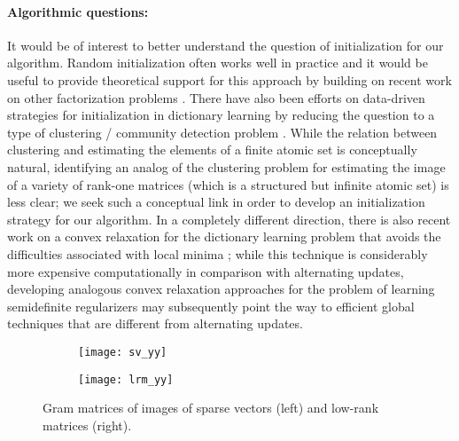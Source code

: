 \documentclass[11pt,letterpaper]{article}
\newcommand{\R}{\mathbb{R}}
\begin{document}
\paragraph{Algorithmic questions:} It would be of interest to better understand the question of initialization for our algorithm.  Random initialization often works well in practice and it would be useful to provide theoretical support for this approach by building on recent work on other factorization problems \cite{GLM:16,SWQ:16c}.  There have also been efforts on data-driven strategies for initialization in dictionary learning by reducing the question to a type of clustering / community detection problem \cite{AAN:17,AGM:14}.  While the relation between clustering and estimating the elements of a finite atomic set is conceptually natural, identifying an analog of the clustering problem for estimating the image of a variety of rank-one matrices (which is a structured but infinite atomic set) is less clear; we seek such a conceptual link in order to develop an initialization strategy for our algorithm.  In a completely different direction, there is also recent work on a convex relaxation for the dictionary learning problem that avoids the difficulties associated with local minima \cite{BKS:15}; while this technique is considerably more expensive computationally in comparison with alternating updates, developing analogous convex relaxation approaches for the problem of learning semidefinite regularizers may subsequently point the way to efficient global techniques that are different from alternating updates.

\begin{figure}
	\centering
	\begin{subfigure}{.5\textwidth}
		\centering
		\texttt{[image: sv\_yy]}
		\label{fig:sparsegram}
	\end{subfigure}%
	\begin{subfigure}{.5\textwidth}
		\centering
		\texttt{[image: lrm\_yy]}
		\label{fig:lowrankgram}
	\end{subfigure}
	\caption{Gram matrices of images of sparse vectors (left) and low-rank matrices (right).}
	\label{fig:gram}
\end{figure}
\end{document}
